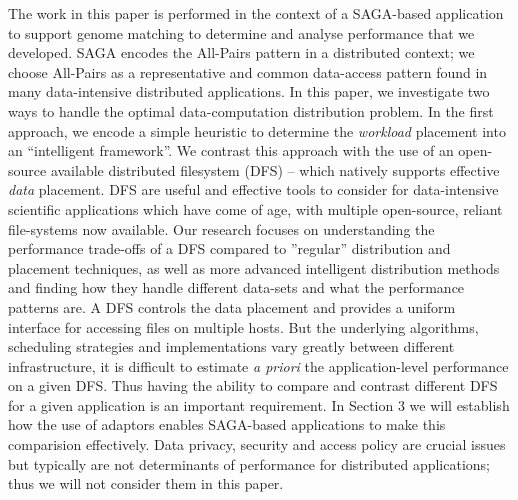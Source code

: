 \documentclass{rspublic}
\newcommand{\micnote}[1]{ {\textcolor{blue} { ***Michael: #1 }}}
\newcommand{\betynote}[1]{ {\textcolor{orange} { ***Bety: #1 }}}
\newcommand{\jhanote}[1]{} \newcommand{\micnote}[1]{}\newcommand{\betynote}[1]{} \newcommand{\fixme}[1]{}
\begin{document}
The work in this paper is performed in the context of a SAGA-based
application to support genome matching to determine and analyse
performance that we developed. SAGA encodes the All-Pairs pattern in a
distributed context; we choose All-Pairs as a representative and
common data-access pattern found in many data-intensive distributed
applications.  In this paper, we investigate two ways to handle the
optimal data-computation distribution problem.  In the first approach,
we encode a simple heuristic to determine the {\it workload} placement
into an ``intelligent framework''. We contrast this approach with the
use of an open-source available distributed filesystem (DFS) -- which
natively supports effective {\it data} placement.  DFS are useful and
effective tools to consider for data-intensive scientific applications
which have come of age, with multiple open-source, reliant
file-systems now available.  Our research focuses on understanding the
performance trade-offs of a DFS compared to ''regular'' distribution
and placement techniques, as well as more advanced intelligent
distribution methods and finding how they handle different data-sets
and what the performance patterns are.  A DFS controls the data
placement and provides a uniform interface for accessing files on
multiple hosts. But the underlying algorithms, scheduling strategies
and implementations vary greatly between different infrastructure, it
is difficult to estimate {\it a priori} the application-level
performance on a given DFS.  Thus having the ability to compare and
contrast different DFS for a given application is an important
requirement. In Section 3 we will establish how the use of adaptors
enables SAGA-based applications to make this comparision
effectively. Data privacy, security and access policy are crucial
issues but typically are not determinants of performance for
distributed applications; thus we will not consider them in this
paper.


\jhanote{add stuff to conclude introduction...} 

\end{document}
